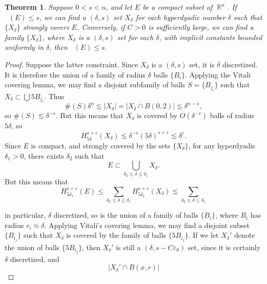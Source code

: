 \documentclass[dvipsnames,letterpaper,12pt]{article}
\numberwithin{equation}{section}
\DeclareMathOperator{\hausdim}{\dim_{\mathbb{H}}}
\DeclareMathOperator{\RR}{\mathbb{R}}
\newtheorem{theorem}{Theorem}
\numberwithin{theorem}{section}
\begin{document}
\begin{theorem}
    Suppose $0 < s < n$, and let $E$ be a compact subset of $\RR^n$. If $\hausdim(E) \leq s$, we can find a $(\delta,s)$ set $X_\delta$ for each hyperdyadic number $\delta$ such that $\{ X_\delta \}$ strongly covers $E$. Conversely, if $C > 0$ is sufficiently large, we can find a family $\{ X_\delta \}$, where $X_\delta$ is a $(\delta, s)$ set for each $\delta$, with implicit constants bounded uniformly in $\delta$, then $\hausdim(E) \leq s$.
\end{theorem}
\begin{proof}
    Suppose the latter constraint. Since $X_\delta$ is a $(\delta, s)$ set, it is $\delta$ discretized. It is therefore the union of a family of radius $\delta$ balls $\{ B_i \}$. Applying the Vitali covering lemma, we may find a disjoint subfamily of balls $S = \{ B_{j_i} \}$ such that $X_\delta \subset \bigcup 5 B_{j_i}$. Thus
    \[ \#(S) \delta^n \lesssim |X_\delta| = |X_\delta \cap B(0,2)| \lesssim \delta^{n-s}, \]
    so $\#(S) \lesssim \delta^{-s}$. But this means that $X_\delta$ is covered by $O(\delta^{-s})$ balls of radius $5 \delta$, so
    \[ H^{s+\varepsilon}_{5\delta}(X_\delta) \lesssim \delta^{-s} (5\delta)^{s + \varepsilon} \lesssim \delta^\varepsilon. \]
    Since $E$ is compact, and strongly covered by the sets $\{ X_\delta \}$, for any hyperdyadic $\delta_1 > 0$, there exists $\delta_2$ such that
    \[ E \subset \bigcup_{\delta_2 \leq \delta \leq \delta_1} X_\delta. \]
    But this means that
    \[ H^{s+\varepsilon}_{5\delta_1}(E) \leq \sum_{\delta_2 \leq \delta \leq \delta_1} H^{s + \varepsilon}_{5 \delta_1}(X_\delta) \lesssim \sum_{\delta_2 \leq \delta \leq \delta_1} \]

    in particular, $\delta$ discretized, so is the union of a family of balls $\{ B_i \}$, where $B_i$ has radius $r_i \approx \delta$. Applying Vitali's covering lemma, we may find a disjoint subset $\{ B_{i_j} \}$ such that $X_\delta$ is covered by the family of balls $\{ 5 B_{i_j} \}$. If we let $X_\delta'$ denote the union of balls $\{ 5 B_{i_j} \}$, then $X_\delta'$ is still a $(\delta, s - C \varepsilon_0)$ set, since it is certainly $\delta$ discretized, and
    \[ |X_\delta' \cap B(x,r)| \]


\end{proof}
\end{document}
